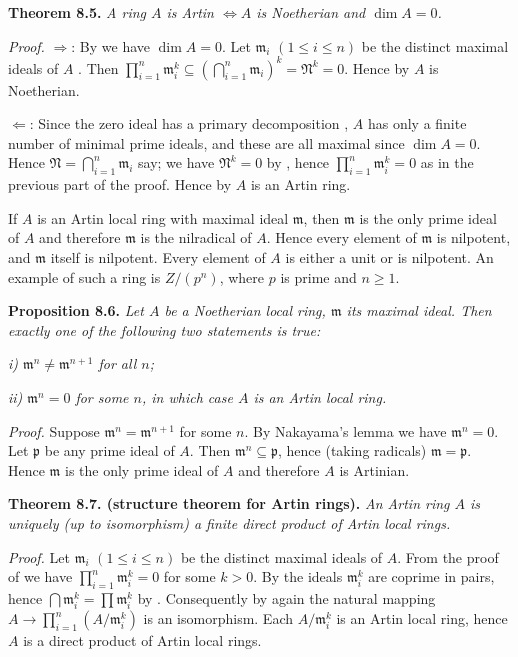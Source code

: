 \noindent\textbf{Theorem 8.5.} \emph{A ring \(A\) is Artin \(\Longleftrightarrow A\) is Noetherian and \(\dim A=0\).}

\noindent\emph{Proof.} \(\Rightarrow\): By  we have \(\dim A=0\). Let \(\mathfrak m_i\) \((1\leq i\leq n)\) be the distinct maximal ideals of \(A\) . Then \(\prod_{i=1}^n\mathfrak m_i^k\subseteq(\bigcap_{i=1}^n\mathfrak m_i)^k=\mathfrak N^k=0\). Hence by  \(A\) is Noetherian.

\(\Leftarrow\): Since the zero ideal has a primary decomposition , \(A\) has only a finite number of minimal prime ideals, and these are all maximal since \(\dim A=0\). Hence \(\mathfrak N=\bigcap_{i=1}^n\mathfrak m_i\) say; we have \(\mathfrak N^k=0\) by , hence \(\prod_{i=1}^n\mathfrak m_i^k=0\) as in the previous part of the proof. Hence by  \(A\) is an Artin ring. \proofbox

If \(A\) is an Artin local ring with maximal ideal \(\mathfrak m\), then \(\mathfrak m\) is the only prime ideal of \(A\) and therefore \(\mathfrak m\) is the nilradical of \(A\). Hence every element of \(\mathfrak m\) is nilpotent, and \(\mathfrak m\) itself is nilpotent. Every element of \(A\) is either a unit or is nilpotent. An example of such a ring is \(Z/(p^n)\), where \(p\) is prime and \(n\geq1\).

\noindent\textbf{Proposition 8.6.} \emph{Let \(A\) be a Noetherian local ring, \(\mathfrak m\) its maximal ideal. Then exactly one of the following two statements is true:}

\emph{i) \(\mathfrak m^n\neq\mathfrak m^{n+1}\) for all \(n\);}

\emph{ii) \(\mathfrak m^n=0\) for some \(n\), in which case \(A\) is an Artin local ring.}

\noindent\emph{Proof.} Suppose \(\mathfrak m^n=\mathfrak m^{n+1}\) for some \(n\). By Nakayama's lemma  we have \(\mathfrak m^n=0\). Let \(\mathfrak p\) be any prime ideal of \(A\). Then \(\mathfrak m^n\subseteq\mathfrak p\), hence (taking radicals) \(\mathfrak m=\mathfrak p\). Hence \(\mathfrak m\) is the only prime ideal of \(A\) and therefore \(A\) is Artinian. \proofbox

\noindent\textbf{Theorem 8.7. (structure theorem for Artin rings).} \emph{An Artin ring \(A\) is uniquely (up to isomorphism) a finite direct product of Artin local rings.}

\noindent\emph{Proof.} Let \(\mathfrak m_i\) \((1\leq i\leq n)\) be the distinct maximal ideals of \(A\). From the proof of  we have \(\prod_{i=1}^n\mathfrak m_i^k=0\) for some \(k>0\). By  the ideals \(\mathfrak m_i^k\) are coprime in pairs, hence \(\bigcap\mathfrak m_i^k=\prod\mathfrak m_i^k\) by . Consequently by  again the natural mapping \(A\to\prod_{i=1}^n(A/\mathfrak m_i^k)\) is an isomorphism. Each \(A/\mathfrak m_i^k\) is an Artin local ring, hence \(A\) is a direct product of Artin local rings.

